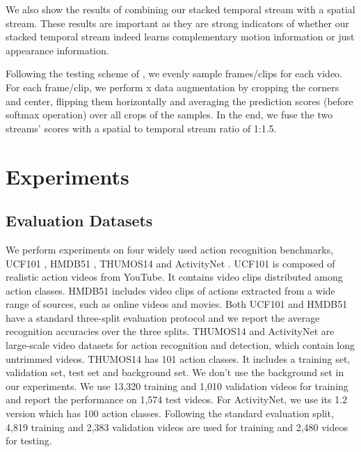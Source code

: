 \documentclass[runningheads]{llncs}
\begin{document}
		We also show the results of combining our stacked temporal stream with a spatial stream. These results are important as they are strong indicators of whether our stacked temporal stream indeed learns complementary motion information or just appearance information. 
		
		Following the testing scheme of \cite{twostream2014,wanggoodpractice2015}, we evenly sample  frames/clips for each video. For each frame/clip, we perform x data augmentation by cropping the  corners and  center, flipping them horizontally and averaging the prediction scores (before softmax operation) over all crops of the samples. In the end, we fuse the two streams' scores with a spatial to temporal stream ratio of 1:1.5.
		
		
		\section{Experiments}
		\label{sec:experiments}
		
		\subsection{Evaluation Datasets}
		\label{sec:dataset}
		We perform experiments on {\color{black} four} widely used action recognition benchmarks, UCF101 \cite{ucf101}, HMDB51 \cite{hmdb51}, {\color{black} THUMOS14 \cite{THUMOS15} and ActivityNet \cite{activityNet}}.
		UCF101 is composed of realistic action videos from YouTube. It contains  video clips distributed among  action classes. HMDB51 includes  video clips of  actions extracted from a wide range of sources, such as online videos and movies.
		Both UCF101 and HMDB51 have a standard three-split evaluation protocol and we report the average recognition accuracies over the three splits. {\color{black} THUMOS14 and ActivityNet are large-scale video datasets for action recognition and detection, which contain long untrimmed videos. THUMOS14 has 101 action classes. It includes a training set, validation set, test set and background set. We don't use the background set in our experiments. We use 13,320 training and 1,010 validation videos for training and report the performance on 1,574 test videos. For ActivityNet, we use its 1.2 version which has 100 action classes. Following the standard evaluation split, 4,819 training and 2,383 validation videos are used for training and 2,480 videos for testing. }
		
\end{document}
